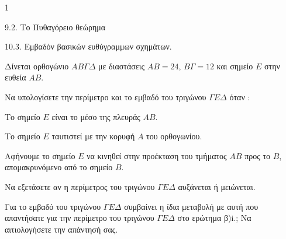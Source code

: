 \begin{ylh}{1}
    \item 9.2. Το Πυθαγόρειο θεώρημα
    \item 10.3. Εμβαδόν βασικών ευθύγραμμων σχημάτων.
\end{ylh}
Δίνεται ορθογώνιο $ΑΒΓΔ$ με διαστάσεις $ΑΒ = 24$, $ΒΓ = 12$ και σημείο $Ε$ στην ευθεία $ΑΒ$.
\begin{alist}
\item Να υπολογίσετε την περίμετρο και το εμβαδό του τριγώνου $ΓΕΔ$ όταν :
    \begin{rlist}
    \item Το σημείο $Ε$ είναι το μέσο της πλευράς $ΑΒ$.
    \item Το σημείο $Ε$ ταυτιστεί με την κορυφή $Α$ του ορθογωνίου.
    \end{rlist}
\item Αφήνουμε το σημείο $Ε$ να κινηθεί στην προέκταση του τμήματος $ΑΒ$ προς το $Β$, απομακρυνόμενο από το σημείο $Β$.
    \begin{rlist}
    \item Να εξετάσετε αν η περίμετρος του τριγώνου $ΓΕΔ$ αυξάνεται ή μειώνεται. 
    \item Για το εμβαδό του τριγώνου $ΓΕΔ$ συμβαίνει η ίδια μεταβολή με αυτή που απαντήσατε για την περίμετρο του τριγώνου $ΓΕΔ$ στο ερώτημα β)i.; Να αιτιολογήσετε την απάντησή σας. 
    \end{rlist}
\end{alist}